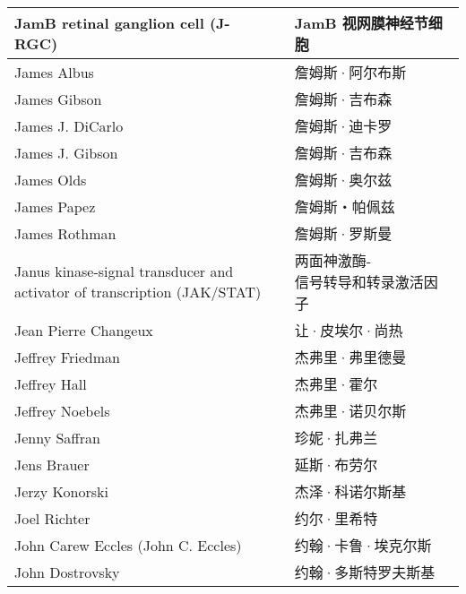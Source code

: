 \begin{longtable}{lll}
	\midrule
	JamB retinal ganglion cell (J-RGC)   && JamB 视网膜神经节细胞  \\
	
	\midrule
	James Albus   && 詹姆斯·阿尔布斯  \\
	
	\midrule
	James Gibson   && 詹姆斯·吉布森  \\
	
	\midrule
	James J. DiCarlo   && 詹姆斯·迪卡罗  \\
	
	\midrule
	James J. Gibson   && 詹姆斯·吉布森  \\
	
	\midrule
	James Olds   && 詹姆斯·奥尔兹  \\
	
	\midrule
	James Papez   && 詹姆斯‧帕佩兹  \\
	
	\midrule
	James Rothman   && 詹姆斯·罗斯曼  \\
	
	\midrule
	\makecell[l]{Janus kinase-signal transducer and \\activator of transcription (JAK/STAT)}  && \makecell[l]{两面神激酶-\\信号转导和转录激活因子}  \\
	
	\midrule
	Jean Pierre Changeux   && 让·皮埃尔·尚热  \\
	
	\midrule
	Jeffrey Friedman   && 杰弗里·弗里德曼  \\
	
	\midrule
	Jeffrey Hall   && 杰弗里·霍尔  \\
	
	\midrule
	Jeffrey Noebels   && 杰弗里·诺贝尔斯  \\
	
	\midrule
	Jenny Saffran   && 珍妮·扎弗兰  \\
	
	\midrule
	Jens Brauer   && 延斯·布劳尔  \\
	
	\midrule
	Jerzy Konorski   && 杰泽·科诺尔斯基  \\
	
	\midrule
	Joel Richter   && 约尔·里希特  \\
	
	\midrule
	John Carew Eccles (John C. Eccles)   && 约翰·卡鲁·埃克尔斯  \\
	
	\midrule
	John Dostrovsky   && 约翰·多斯特罗夫斯基  \\
	

\end{longtable}
